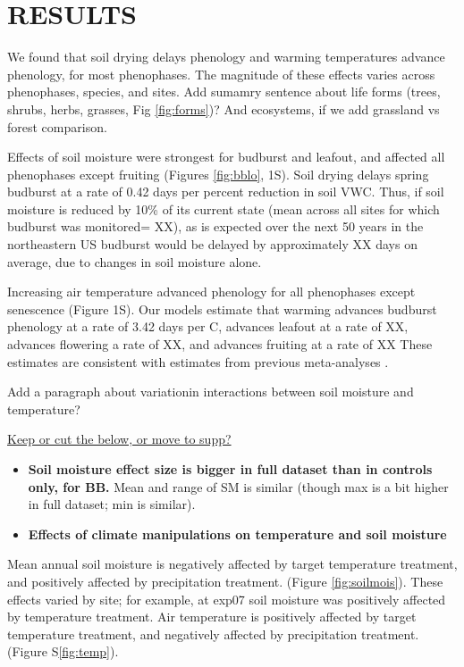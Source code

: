 \documentclass{article}
\begin{document}
\section* {RESULTS}

We found that soil drying delays phenology and warming temperatures advance phenology, for most phenophases. The magnitude of these effects varies across phenophases, species, and sites. Add sumamry sentence about life forms (trees, shrubs, herbs, grasses, Fig \ref{fig:forms})? And ecosystems, if we add grassland vs forest comparison.
\par Effects of soil moisture were strongest for budburst and leafout, and affected all phenophases except fruiting (Figures \ref{fig:bblo}, 1S). Soil drying delays spring budburst at a rate of 0.42 days per percent reduction in soil VWC. Thus, if soil moisture is reduced by 10\% of its current state (mean across all sites for which budburst was monitored= XX), as is expected over the next 50 years in the northeastern US \citep{berg2017} budburst would be delayed by approximately XX days on average, due to changes in soil moisture alone.

\par  Increasing air temperature advanced phenology for all phenophases except senescence (Figure 1S). Our models estimate that warming advances budburst phenology at a rate of 3.42 days per \degree C, advances leafout at a rate of XX, advances flowering a rate of XX, and advances fruiting at a rate of XX These estimates are consistent with estimates from previous meta-analyses \citep{wolkovich2012}. 

\par  Add a paragraph about variationin interactions between soil moisture and temperature? 

\par \underline{Keep or cut the below, or move to supp?}%
\begin{itemize}
\item \textbf{Soil moisture effect size is bigger in full dataset than in controls only, for BB.} Mean and range of SM is similar (though max is a bit higher in full dataset; min is similar).
\item \textbf{Effects of climate manipulations on temperature and soil moisture}
\end{itemize}
\par Mean annual soil moisture is negatively affected by target temperature treatment, and positively affected by precipitation treatment. (Figure \ref {fig:soilmois}). These effects varied by site; for example, at exp07 soil moisture was positively affected by temperature treatment. Air temperature is positively affected by target temperature treatment, and negatively affected by precipitation treatment. (Figure S\ref {fig:temp}).
\end{document}
